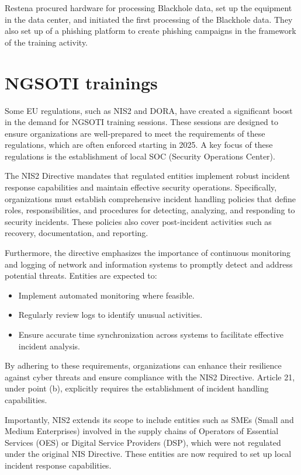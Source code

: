 Restena procured hardware for processing Blackhole data, set up the equipment in the data center, and initiated the first processing of the Blackhole data.
They also set up of a phishing platform to create phishing campaigns in the framework of the training activity.

\chapter{NGSOTI trainings}
Some EU regulations, such as NIS2 and DORA, have created a significant boost in the demand for NGSOTI training sessions. These sessions are designed to ensure organizations are well-prepared to meet the requirements of these regulations, which are often enforced starting in 2025. A key focus of these regulations is the establishment of local SOC (Security Operations Center).

The NIS2 Directive mandates that regulated entities implement robust incident response capabilities and maintain effective security operations. Specifically, organizations must establish comprehensive incident handling policies that define roles, responsibilities, and procedures for detecting, analyzing, and responding to security incidents. These policies also cover post-incident activities such as recovery, documentation, and reporting.

Furthermore, the directive emphasizes the importance of continuous monitoring and logging of network and information systems to promptly detect and address potential threats. Entities are expected to:

\begin{itemize}
	\item Implement automated monitoring where feasible.
	\item Regularly review logs to identify unusual activities.
	\item Ensure accurate time synchronization across systems to facilitate effective incident analysis.
\end{itemize}

By adhering to these requirements, organizations can enhance their resilience against cyber threats and ensure compliance with the NIS2 Directive. Article 21, under point (b), explicitly requires the establishment of incident handling capabilities.

Importantly, NIS2 extends its scope to include entities such as SMEs (Small and Medium Enterprises) involved in the supply chains of Operators of Essential Services (OES) or Digital Service Providers (DSP), which were not regulated under the original NIS Directive. These entities are now required to set up local incident response capabilities.

